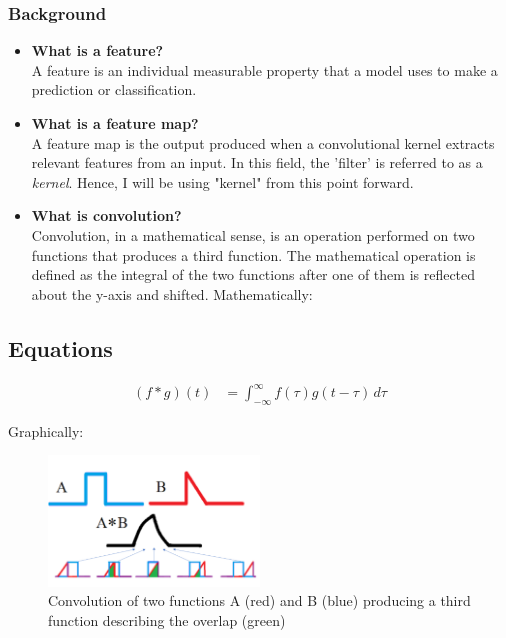 \documentclass{article}
\begin{document}
\subsubsection{Background}
\begin{itemize}
  \item \textbf{What is a feature?} \\
    A feature is an individual measurable property that a model uses to make a prediction or classification.
  \item \textbf{What is a feature map?} \\
    A feature map is the output produced when a convolutional kernel extracts relevant features from an input. In this field, the 'filter' is referred to as a \emph{kernel}. Hence, I will be using "kernel" from this point forward.
  \item \textbf{What is convolution?} \\
    Convolution, in a mathematical sense, is an operation performed on two functions that produces a third function. The mathematical operation is defined as the integral of the two functions after one of them is reflected about the y-axis and shifted. Mathematically:
\end{itemize}

\subsection{Equations}
\begin{align*}
  \left( f  * g \right) \left( t \right) &= \int_{-\infty}^{\infty} f \left( \tau \right) g \left( t - \tau \right) \, d\tau
\end{align*}

Graphically:
\begin{figure}[H]
  \begin{center}
    \includegraphics[width=0.5\textwidth]{figures/math_con}
  \end{center}
  \caption{Convolution of two functions A (red) and B (blue) producing a third function describing the overlap (green)}\label{fig:convolution}
\end{figure}
\end{document}
